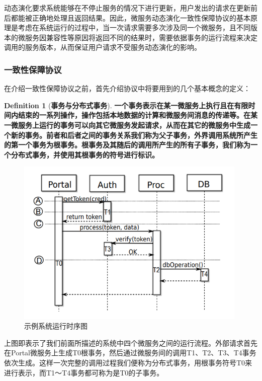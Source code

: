 \documentclass[a4paper, 12pt]{article}
\theoremstyle{definition}
\newtheorem{definition}{Definition}[section]
\begin{document}
动态演化要求系统能够在不停止服务的情况下进行更新，用户发出的请求在更新前后都能被正确地处理且返回结果。因此，微服务动态演化一致性保障协议的基本原理是考虑在系统运行的过程中，当一次请求需要多次涉及同一个微服务，且不同版本的微服务因兼容性等原因将返回不同的结果时，需要依据事务的运行流程来决定调用的服务版本，从而保证用户请求不受服务动态演化的影响。

\subsubsection{一致性保障协议}
在介绍一致性保障协议之前，首先介绍协议中将要用到的几个基本概念的定义：

\theoremstyle{definition}
\begin{definition}[\textbf{事务与分布式事务}]
\label{definition:transaction}
\textbf{一个事务表示在某一微服务上执行且在有限时间内结束的一系列操作，操作包括本地数据的计算和微服务间消息的传递等。在某一微服务上运行的事务可以向其它微服务发起请求，从而在其它的微服务中生成一个新的事务。前者和后者之间的事务关系我们称为父子事务，外界调用系统所产生的第一个事务为根事务。根事务及其随后的调用所产生的所有子事务，我们称为一个分布式事务，并使用其根事务的符号进行标识。}
\end{definition}

\begin{figure}[ht]
 \centering
 \includegraphics[height=8cm]{images/ExampleProcess.png}
 \caption{示例系统运行时序图}
 \label{fig:ExampleProcess}
\end{figure}


上图即表示了我们前面所描述的系统中四个微服务之间的运行流程。外部请求首先在Portal微服务上生成T0根事务，然后通过微服务间的调用T1、T2、T3、T4事务依次生成。这样一次完整的调用过程我们便称为分布式事务，用根事务符号T0来进行表示，而T1～T4事务都可称为是T0的子事务。
\end{document}
